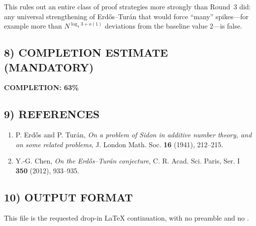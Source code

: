 This rules out an entire class of proof strategies more strongly than Round~3 did: any universal strengthening of Erd\H{o}s--Tur\'an that would force ``many'' spikes---for example more than \(N^{\log_4 3+o(1)}\) deviations from the baseline value \(2\)---is false.

\subsection*{8) COMPLETION ESTIMATE (MANDATORY)}
\textbf{COMPLETION: 63\%}

\subsection*{9) REFERENCES}
\begin{enumerate}
\item P. Erd\H{o}s and P. Tur\'an, \emph{On a problem of Sidon in additive number theory, and on some related problems}, J. London Math. Soc. \textbf{16} (1941), 212--215.
\item Y.-G. Chen, \emph{On the Erd\H{o}s--Tur\'an conjecture}, C. R. Acad. Sci. Paris, Ser. I \textbf{350} (2012), 933--935.
\end{enumerate}

\subsection*{10) OUTPUT FORMAT}
This file is the requested drop-in \LaTeX{} continuation, with no preamble and no \verb||.
